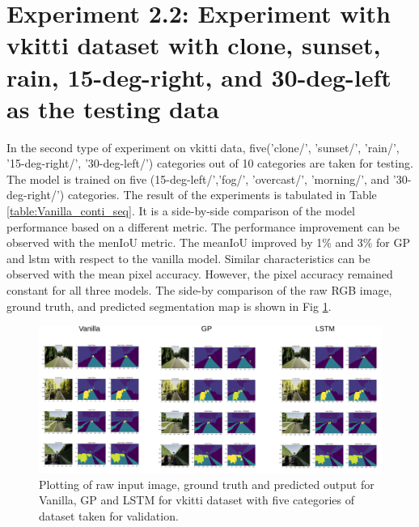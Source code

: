 	\section{Experiment 2.2: Experiment with vkitti dataset with clone, sunset, rain, 15-deg-right, and 30-deg-left as the testing data}
		
	In the second type of experiment on vkitti data, five('clone/', 'sunset/', 'rain/', '15-deg-right/',
	'30-deg-left/') categories out of 10 categories are taken for testing. The model is trained on five (15-deg-left/','fog/', 'overcast/', 'morning/', and '30-deg-right/') categories. The result of the experiments is tabulated in Table \ref{table:Vanilla_conti_seq}. It is a side-by-side comparison of the model performance based on a different metric. The performance improvement can be observed with the menIoU metric. The meanIoU improved by 1\% and 3\% for GP and lstm with respect to the vanilla model. Similar characteristics can be observed with the mean pixel accuracy. However, the pixel accuracy remained constant for all three models. The side-by comparison of the raw RGB image, ground truth, and predicted segmentation map is shown in Fig \ref{fig:unet_side_by_side_five_classes}. 
	
	\begin{figure}
		\centering
		\includegraphics[width=17cm]{images/unet_vkitti_five.png}
		\caption{Plotting of raw input image, ground truth and predicted output for Vanilla, GP and LSTM for vkitti dataset with five categories of dataset taken for validation.}
		\label{fig:unet_side_by_side_five_classes}
	\end{figure}

